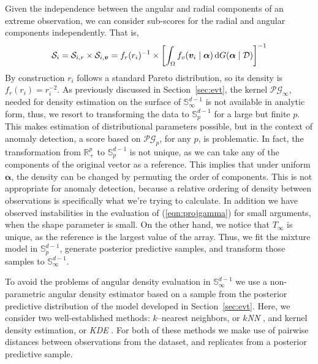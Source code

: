 Given the independence between the angular and radial components of an
    extreme observation, we can consider sub-scores for the radial 
    and angular components independently.  That is,
    \[
        \mathcal{S}_i = \mathcal{S}_{i,r}\times \mathcal{S}_{i,\bm{v}} = 
            f_r(r_i)^{-1}\times
            \left[\int_{\Omega} f_v(\bm{v}_i\mid\bm{\alpha})
                \,\text{d}G(\bm{\alpha}\mid\mathcal{D})\right]^{-1}
    \]
    By construction $r_i$ follows a standard Pareto distribution, so its
    density is $f_r(r_i) = r_i^{-2}$.  As previously discussed in
    Section~\ref{sec:evt}, the kernel $\mathcal{PG}_\infty$, needed for 
    density estimation on the surface of ${\mathbb S}_{\infty}^{d-1}$ is 
    not available in analytic form, thus, we resort to transforming the
    data to $\mathbb{S}_p^{d-1}$ for a large but finite $p$.
    This makes estimation of distributional parameters possible, 
    but in the context of anomaly detection, a score based on
    $\mathcal{PG}_p$, for any $p$, is problematic.  In fact, the 
    transformation from ${\mathbb R}_+^p$ to $\mathbb{S}_p^{d-1}$ is not
    unique, as we can take any of the components of the original vector
    as a reference. 
    This implies that
    under uniform $\bm{\alpha}$, the density can be changed by
    permuting the order of components.  This is not appropriate for anomaly
    detection, because a relative ordering of density between 
    observations is specifically what we're trying to calculate. In addition
    we have observed instabilities in the evaluation of (\ref{eqn:projgamma}) 
    for small arguments, when the shape parameter is small. On the other hand,
    we notice that $T_\infty$ is unique, as the reference is the largest value
    of the array. Thus, we fit the mixture model in $\mathbb{S}_p^{d-1}$, generate
    posterior predictive samples, and transform those samples to 
    $\mathbb{S}_\infty^{d-1}$.

To avoid the problems of angular density evaluation in $\mathbb{S}_\infty^{d-1}$ we use a 
    non-parametric angular density estimator based on a sample from the 
    posterior predictive distribution of the model developed in 
    Section~\ref{sec:evt}. Here, we consider two well-established
    methods: $k$--nearest neighbors, or \emph{$k$NN} \citep{mack1979}, and 
    kernel density estimation, or \emph{KDE} \citep{parzen1962}.  For both of 
    these methods we make use of pairwise distances between observations 
    from the dataset, and replicates from a posterior predictive sample.  

